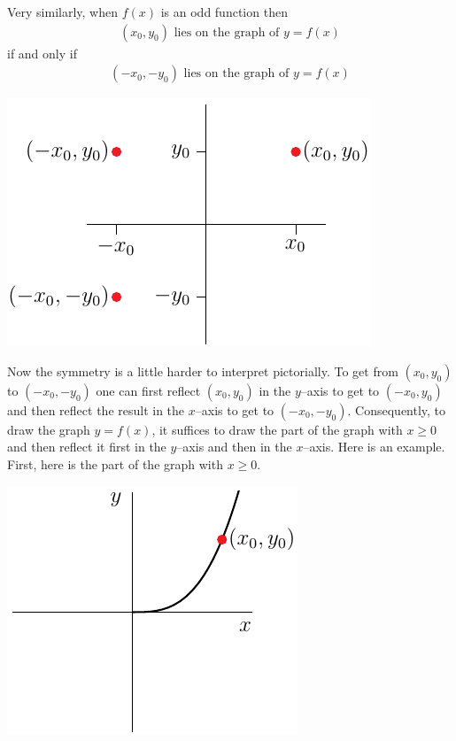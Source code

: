Very similarly, when $f(x)$ is an odd function then
\begin{align*}
(x_0,y_0)\text{ lies on the graph of }y=f(x)
\end{align*}
if and only if
\begin{align*}
(-x_0,-y_0)\text{ lies on the graph of }y=f(x)
\end{align*}
\begin{efig}
\begin{center}
   \includegraphics{oddPt}
\end{center}
\end{efig}
Now the symmetry is a little harder to interpret pictorially. To get from $(x_0,y_0)$ to
$(-x_0,-y_0)$ one can first reflect $(x_0,y_0)$ in the $y$--axis to get to $(-x_0,y_0)$
and then reflect the result in the $x$--axis to get to $(-x_0,-y_0)$. Consequently, to
draw the graph $y=f(x)$, it suffices to draw the part of the graph with $x\ge 0$ and then
reflect it first in the $y$--axis and then in the $x$--axis.
Here is an example. First, here is the part of the graph with $x\ge 0$.
\begin{efig}
\begin{center}
   \includegraphics{oddRt}
\end{center}
\end{efig}
